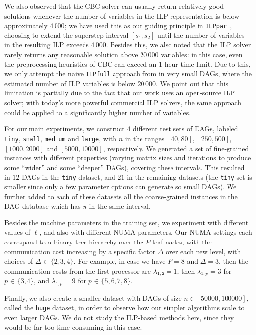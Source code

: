 \documentclass[sigconf,nonacm]{acmart}
\begin{document}
We also observed that the CBC solver can usually return relatively good solutions whenever the number of variables in the ILP representation is below approximately $4_{\,}000$; we have used this as our guiding principle in \texttt{ILPpart}, choosing to extend the superstep interval $[s_1, s_2]$ until the number of variables in the resulting ILP exceeds $4_{\,}000$. Besides this, we also noted that the ILP solver rarely returns any reasonable solution above $20_{\,}000$ variables: in this case, even the preprocessing heuristics of CBC can exceed an $1$-hour time limit. Due to this, we only attempt the naive \texttt{ILPfull} approach from \cite{DAGBSP} in very small DAGs, where the estimated number of ILP variables is below $20_{\,}000$. We point out that this limitation is partially due to the fact that our work uses an open-source ILP solver; with today's more powerful commercial ILP solvers, the same approach could be applied to a significantly higher number of variables.

For our main experiments, we construct $4$ different test sets of DAGs, labeled \texttt{tiny}, \texttt{small}, \texttt{medium} and \texttt{large}, with $n$ in the ranges $[40,80]$, $[250, 500]$, $[1000, 2000]$ and $[5000, 10000]$, respectively. We generated a set of fine-grained instances with different properties (varying matrix sizes and iterations to produce some ``wider'' and some ``deeper'' DAGs), covering these intervals. This resulted in $12$ DAGs in the \texttt{tiny} dataset, and $21$ in the remaining datasets (the \texttt{tiny} set is smaller since only a few parameter options can generate so small DAGs). We further added to each of these datasets all the coarse-grained instances in the DAG database which has $n$ in the same interval.

Besides the machine parameters in the training set, we experiment with different values of $\ell$, and also with different NUMA parameters. Our NUMA settings each correspond to a binary tree hierarchy over the $P$ leaf nodes, with the communication cost increasing by a specific factor $\Delta$ over each new level, with choices of $\Delta _{\!} \in _{\!} \{2,3,4\}$. For example, in case we have $P\!=\!8$ and $\Delta\!=\!3$, then the communication costs from the first processor are $\lambda_{1, 2}\!=\!1$, then $\lambda_{1, p}\!=\!3$ for $p _{\!} \in _{\!} \{ 3, 4\}$, and $\lambda_{1, p}\!=\!9$ for $p _{\!} \in _{\!} \{ 5, 6, 7, 8\}$.

Finally, we also create a smaller dataset with DAGs of size $n \in [50000, 100000]$, called the \texttt{huge} dataset, in order to observe how our simpler algorithms scale to even larger DAGs. We do not study the ILP-based methods here, since they would be far too time-consuming in this case.
\end{document}
